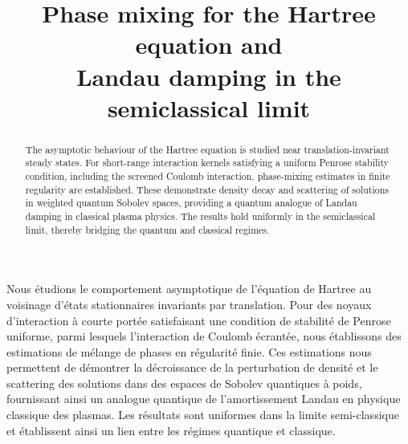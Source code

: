 \documentclass[JEP,XML,SOM,Unicode]{cedram}
\theoremstyle{plain}
\theoremstyle{remark}
\begin{document}
\frontmatter

\title[Phase mixing for the Hartree equation]{Phase mixing for the Hartree equation and \\
Landau damping in the semiclassical limit}

\author[\initial{M.} \lastname{Smith}]{ }
\address{Department of Pure Mathematics and Mathematical Statistics, University of Cambridge,\\
Wilberforce Road, Cambridge CB3 0WB, United Kingdom}
\urladdr{}

\begin{abstract}
The asymptotic behaviour of the Hartree equation is studied near translation-invariant steady states. For short-range interaction kernels satisfying a uniform Penrose stability condition, including the screened Coulomb interaction, phase-mixing estimates in finite regularity are established. These demonstrate density decay and scattering of solutions in weighted quantum Sobolev spaces, providing a quantum analogue of Landau damping in classical plasma physics. The results hold uniformly in the semiclassical limit, thereby bridging the quantum and classical regimes.
\end{abstract}





\begin{altabstract}
Nous étudions le comportement asymptotique de l'équation de Hartree au voisinage d'états stationnaires invariants par translation. Pour des noyaux d'interaction à courte portée satisfaisant une condition de stabilité de Penrose uniforme, parmi lesquels l'interaction de Coulomb écrantée, nous établissons des estimations de mélange de phases en régularité finie. Ces esti\-mations nous permettent de démontrer la décroissance de la perturbation de densité et le scattering des solutions dans des espaces de Sobolev quantiques à poids, fournissant ainsi un analogue quantique de l'amortissement Landau en physique classique des plasmas. Les résultats sont uniformes dans la limite semi-classique et établissent ainsi un lien entre les régimes quantique et classique.
\end{altabstract}
\end{document}
